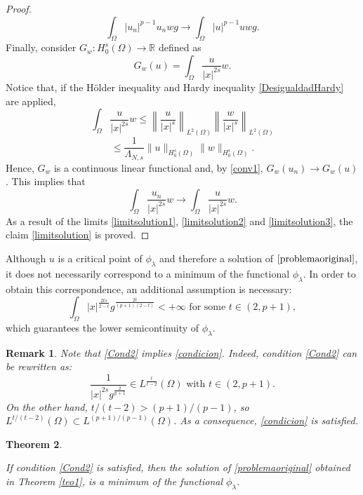 \documentclass[preprint,12pt]{elsarticle}
\newtheorem{theorem}{Theorem}[section]
\newtheorem{remark}[theorem]{Remark}
\begin{document}
\begin{proof}
\begin{equation}
				\int_{\Omega}|u_n|^{p-1}u_nwg\rightarrow  \int_{\Omega}|u|^{p-1}uwg.
			\end{equation}
			Finally, consider $G_w: H^s_0(\Omega)\rightarrow \mathbb{R}$ defined as
			\[G_w(u)=\int_{\Omega}\frac{u}{|x|^{2s}}w.\]
			Notice that, if the H\"older inequality and Hardy inequality \eqref{DesigualdadHardy} are applied,
			\[\int_{\Omega}\frac{u}{|x|^{2s}}w\leq \left\|\frac{u}{|x|^{s}}\right\|_{L^2(\Omega)} \left\|\frac{w}{|x|^{s}}\right\|_{L^2(\Omega)} \]\[\leq \frac{1}{\Lambda_{N,s}}\|u\|_{H^s_0(\Omega)}\|w\|_{H^s_0(\Omega)}.\]
			Hence, $G_w$ is a continuous linear functional and, by \ref{conv1}, ${G_w(u_n)\rightarrow G_w(u)}$. This implies that
			\begin{equation}\label{limitsolution3}
				\int_\Omega \frac{u_n}{|x|^{2s}}w\rightarrow \int_\Omega \frac{u}{|x|^{2s}}w.
			\end{equation}
			As a result of the limits \eqref{limitsolution1},  \eqref{limitsolution2} and  \eqref{limitsolution3}, the claim \eqref{limitsolution} is proved.
		\end{proof}
		
		
		
		Although $u$ is a critical point of $\phi_{\lambda}$ and therefore a solution of $\eqref{problemaoriginal}$, it does not necessarily correspond to a minimum of the functional $\phi_\lambda$. In order to obtain this correspondence,  an additional assumption is necessary:
		\begin{equation}\label{Cond2}
			\int_{\Omega}|x|^{\frac{2ts}{2-t}}g^{\frac{2t}{(p+1)(2-t)}}<+\infty \text{ for some $t\in (2,p+1)$},
		\end{equation}
		which guarantees the lower semicontinuity of $\phi_\lambda.$
		
		\begin{remark}
			Note that \eqref{Cond2} implies \eqref{condicion}. Indeed, condition \eqref{Cond2} can be rewritten as: 
			\[\frac{1}{|x|^{2s}g^{\frac{2}{p+1}}}\in L^{\frac{t}{t-2}}(\Omega) \text{ with $t\in (2,p+1)$}.\]
			On the other hand, $t/(t-2)>(p+1)/(p-1)$, so $L^{t/(t-2)}(\Omega)\subset L^{(p+1)/(p-1)}(\Omega)$. As a consequence, \eqref{condicion}  is satisfied.
		\end{remark}
		
		\begin{theorem}\label{propo}
			
			If condition \eqref{Cond2} is satisfied, then the solution of \eqref{problemaoriginal} obtained in Theorem \ref{teo1}, is a minimum of the functional $\phi_{\lambda}$.
		\end{theorem}
		
\end{document}
